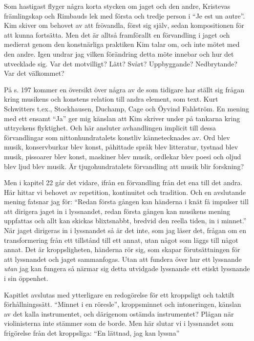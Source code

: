 \documentclass{article}
\begin{document}
Som hastigast flyger några korta stycken om jaget och den andre, Kristevas främlingskap och Rimbauds lek med första och tredje person i ``Je est un autre''. Kim skiver om behovet av att frövandla, först sig själv, sedan kompositionen för att kunna fortsätta. Men det är alltså framförallt en förvandling i jaget och medierat genom den konstnärliga praktiken Kim talar om, och inte mötet med den andre. Igen undrar jag vilken förändring detta möte innebar och hur det utvecklade sig. Var det motvilligt? Lätt? Svårt? Uppbyggande? Nedbrytande? Var det välkommet?

På s. 197 kommer en översikt över några av de som tidigare har ställt sig frågan kring musikens och konstens relation till andra element, som text. Kurt Schwitters t.ex., Stockhausen, Duchamp, Cage och Öyvind Fahlström. En mening med ett ensamt ``Ja'' ger mig känslan att Kim skriver under på tankarna kring uttryckens flyktighet. Och här ansluter avhandlingen implicit till dessa förvandlingar som nittonhundratalets konstliv kännetecknades av. Ord blev musik, konservburkar blev konst, påhittade språk blev litteratur, tystnad blev musik, pissoarer blev konst, maskiner blev musik, ordlekar blev poesi och oljud blev ljud blev musik. Är tjugohundratalets förvandling att musik blir forskning?

Men i kapitel 22 går det vidare, ifrån en förvandling från det ena till det andra. Här hittar vi behovet av repetition, kontinuitet och tradition. Och en avslutande mening fatsnar jag för: ``Redan första gången kan händerna i knät få impulser till att dirigera jaget in i lyssnandet, redan första gången kan musikens mening uppfattas och allt kan skickas blixtsnabbt, bredvid den reella tiden, in i minnet.'' När jaget dirigeras in i lyssnandet så är det inte, som jag läser det, frågan om en transformering från ett tillstånd till ett annat, utan något som läggs till något annat. Det är kroppsligheten, händerna rör sig, som skapar förutsättningen för att lyssnandet och jaget sammanfogas. Utan att fundera över hur ett lyssnande \emph{utan} jag kan fungera så närmar sig detta utvidgade lyssnande ett etiskt lyssnande i sin öppenhet.

Kapitlet avslutas med ytterligare en redogörelse för ett kroppsligt och taktilt förhållningssätt. ``Minnet i en röresle'', kroppsminnet och intoneringen, känslan av det kalla instrumentet, och därigenom ostämda instrumentet? Plågan när violinisterna inte stämmer som de borde. Men här slutar vi i lyssnandet som frigörelse från det kroppsliga: ``En lättnad, jag kan lyssna''
\end{document}
